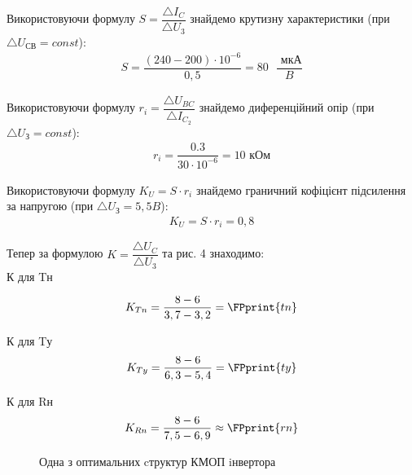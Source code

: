 \documentclass[a4paper,14pt]{extreport}
\begin{document}
\newpage

\FPeval{}

Використовуючи формулу $S = \dfrac{\triangle I_C}{\triangle U_{\text{3}}}$ знайдемо крутизну характеристики (при $\triangle U_{\text{СВ}} = const$):
\begin{align*}
  S = \dfrac{(240-200)\cdot10^{-6}}{0,5} =  80 \text{ } \dfrac{\text{ мкА}}{B}
\end{align*}

Використовуючи формулу $r_i = \dfrac{\triangle U_{BC}}{\triangle I_{C_2}}$ знайдемо диференційний опір (при $\triangle U_{\text{З}} = const$):
\FPeval{}
\begin{align*}
  r_i = \dfrac{0.3}{30\cdot 10^{-6}} = 10\text{ кОм}
\end{align*}

Використовуючи формулу $K_U = S\cdot r_i$ знайдемо граничний кофіцієнт підсилення за напругою (при $\triangle U_{\text{З}} = 5,5 B$):
\FPeval{}
\begin{align*}
  K_U = S\cdot r_i = 0,8
\end{align*}











Тепер за формулою $K = \dfrac{\triangle U_C}{\triangle U_3}$ та рис. 4 знаходимо:\\

К для Tн
\FPeval{}

\FPeval{}
\begin{align*}
  K_{Tn} = \dfrac{8-6}{3,7-3,2} = \FPprint{tn}
\end{align*}

К для Tу
\FPeval{}
\begin{align*}
  K_{Ty} = \dfrac{8-6}{6,3-5,4} = \FPprint{ty}
\end{align*}

К для Rн
\FPeval{}
\begin{align*}
  K_{Rn} = \dfrac{8-6}{7,5-6,9} \approx \FPprint{rn}
\end{align*}



\newpage
\begin{figure}[h]
\caption{ Одна з оптимальних cтруктур КМОП iнвертора}
\end{figure}
\end{document}
